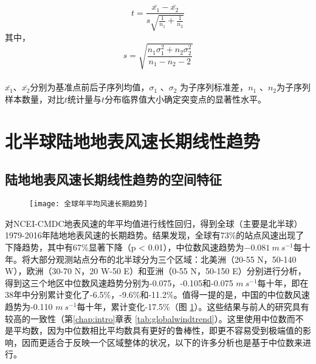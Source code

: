 \begin{equation} \label{eq:mvttest}
t = \frac{\bar{x_{1}} - \bar{x_{2}}}{ s \sqrt{\frac{1}{n_{1}} + \frac{1}{n_{2}}}}
\end{equation} 
其中，
\begin{equation} 
s = \sqrt{\frac{n_{1}\sigma_{1}^{2} + n_{2}\sigma_{2}^{2}}{n_{1} - n_{2} - 2}}
\end{equation} ~\\
$\bar{x_{1}}$、$\bar{x_{2}}$分别为基准点前后子序列均值，$\sigma_{1}$ 、$\sigma_{2}$  为子序列标准差，$n_{1}$ 、$n_{2}$为子序列样本数量，对比$t$统计量与$t$分布临界值大小确定突变点的显著性水平。

\section{北半球陆地地表风速长期线性趋势}\label{sec:NHwindchange}

\subsection{陆地地表风速长期线性趋势的空间特征}

\begin{figure}[!t]
    \centering
    \texttt{[image: 全球年平均风速长期趋势]}
    \label{fig:NHwindtrend}
\end{figure}

对NCEI-CMDC地表风速的年平均值进行线性回归，得到全球（主要是北半球）1979-2016年陆地地表风速的长期趋势。结果发现，全球有73\%的站点风速出现了下降趋势，其中有67\%显著下降（p < 0.01），中位数风速趋势为$ -0.081 ~ m ~ s^{-1}$每十年。将大部分观测站点分布的北半球分为三个区域：北美洲（20-55 N，50-140 W），欧洲（30-70 N，20 W-50 E）和亚洲（0-55 N，50-150 E）分别进行分析，得到这三个地区中位数风速趋势分别为-0.075，-0.105和-0.075 $m ~ s^{-1}$每十年，即在38年中分别累计变化了-6.5\%，-9.6\%和-11.2\%。值得一提的是，中国的中位数风速趋势为-0.110 $m ~ s^{-1}$每十年，累计变化-17.5\%（图 \ref{fig:NHwindtrend}）。这些结果与前人的研究具有较高的一致性（第\ref{chap:intro}章\;表 \ref{tab:globalwindtrend}）。这里使用中位数而不是平均数，因为中位数相比平均数具有更好的鲁棒性，即更不容易受到极端值的影响，因而更适合于反映一个区域整体的状况，以下的许多分析也是基于中位数来进行。

